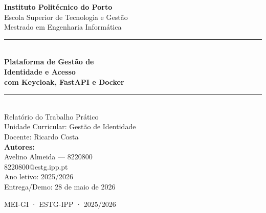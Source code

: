 \begin{titlepage}
  \thispagestyle{empty}
  \centering
  \vspace*{1.5cm}

  {\large\bfseries Instituto Politécnico do Porto}\\[0.3cm]
  {\large Escola Superior de Tecnologia e Gestão}\\[0.5cm]
  {\normalsize Mestrado em Engenharia Informática}\\[2.5cm]

  \rule{\linewidth}{1.2pt}\\[0.5cm]
  {\huge\bfseries Plataforma de Gestão de\\[0.3cm]Identidade e Acesso}\\[0.5cm]
  {\Large\bfseries com Keycloak, FastAPI e Docker}\\[0.5cm]
  \rule{\linewidth}{1.2pt}\\[1.5cm]

  {\large Relatório do Trabalho Prático}\\[0.3cm]
  {\normalsize Unidade Curricular: Gestão de Identidade}\\[0.2cm]
  {\normalsize Docente: Ricardo Costa}\\[2cm]

  {\large\bfseries Autores:}\\[0.5cm]
  {\large Avelino Almeida — 8220800}\\[0.2cm]
  {\normalsize 8220800@estg.ipp.pt}\\[2cm]

  {\normalsize Ano letivo: 2025/2026}\\[0.3cm]
  {\normalsize Entrega/Demo: 28 de maio de 2026}

  \vfill
  {\small MEI-GI · ESTG-IPP · 2025/2026}
\end{titlepage}
